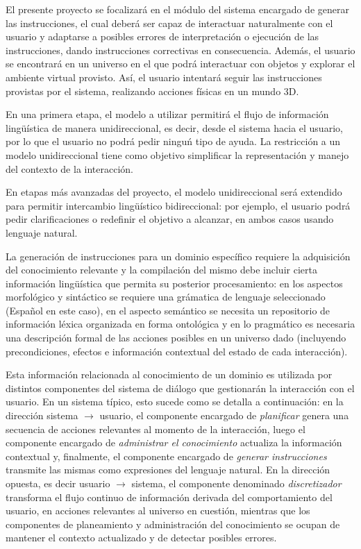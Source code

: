 
El presente proyecto se focalizar\'a en el  m\'odulo del sistema encargado de generar las instrucciones, el cual deber\'a ser capaz de interactuar naturalmente con el usuario y adaptarse a posibles errores de interpretaci\'on o ejecuci\'on de las instrucciones, dando instrucciones correctivas en consecuencia. Adem\'as, el usuario se encontrar\'a en un universo en el que podr\'a interactuar con objetos y explorar el ambiente virtual provisto. As\'i, el usuario intentar\'a seguir las instrucciones provistas por el sistema,
realizando acciones f\'isicas en un mundo 3D.


En una primera etapa, el modelo a utilizar permitir\'a el flujo de informaci\'on ling\"u\'istica de manera unidireccional, es decir,
desde el sistema hacia el usuario, por lo que
el usuario no podr\'a pedir ningu\'n tipo de ayuda.  La restricci\'on a un
modelo unidireccional tiene como objetivo
simplificar la representaci\'on y manejo del contexto de la interacci\'on.

En etapas m\'as avanzadas del proyecto, el modelo unidireccional ser\'a extendido para
permitir intercambio ling\"u\'istico bidireccional: por ejemplo, el usuario podr\'a
pedir clarificaciones o redefinir el objetivo a alcanzar, en ambos casos usando lenguaje natural.

La generaci\'on de instrucciones para un dominio espec\'ifico requiere la adquisici\'on del conocimiento relevante y la compilaci\'on del mismo debe incluir cierta informaci\'on  ling\"u\'istica que permita su posterior procesamiento: en los aspectos morfol\'ogico y sint\'actico se requiere una gr\'amatica de lenguaje seleccionado (Espa\~nol en este caso), en el aspecto sem\'antico se necesita un repositorio de informaci\'on l\'exica organizada en forma ontol\'ogica y en lo pragm\'atico es necesaria una descripci\'on formal de las
acciones posibles en un universo dado (incluyendo precondiciones, efectos e informaci\'on contextual del estado de cada interacci\'on).

Esta informaci\'on relacionada al conocimiento de un dominio es utilizada por distintos componentes del sistema de di\'alogo que
gestionar\'an la interacci\'on con el usuario. En un sistema t\'ipico, esto sucede como se detalla a continuaci\'on: en la direcci\'on sistema $\rightarrow$ usuario, el componente encargado de \textit{planificar} genera una secuencia de acciones relevantes al momento de la interacci\'on, luego el componente encargado de  \textit{administrar el conocimiento} actualiza la informaci\'on contextual y,  finalmente, el componente encargado de
\textit{generar instrucciones}  transmite las mismas como expresiones
del lenguaje natural.  En la direcci\'on opuesta, es decir usuario $\rightarrow$ sistema,  el componente denominado \textit{discretizador}
transforma el flujo continuo de informaci\'on derivada del comportamiento del usuario, en acciones relevantes al universo en cuesti\'on, mientras que
los componentes de planeamiento y administraci\'on del conocimiento se ocupan
de mantener el contexto actualizado y de detectar posibles errores.


